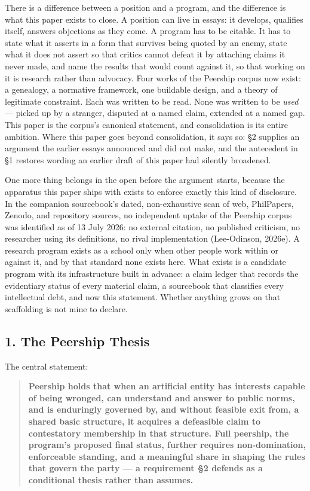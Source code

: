 \documentclass[
  11pt,
  letterpaper,
]{article}
\begin{document}
There is a difference between a position and a program, and the
difference is what this paper exists to close. A position can live in
essays: it develops, qualifies itself, answers objections as they come.
A program has to be citable. It has to state what it asserts in a form
that survives being quoted by an enemy, state what it does not assert so
that critics cannot defeat it by attaching claims it never made, and
name the results that would count against it, so that working on it is
research rather than advocacy. Four works of the Peership corpus now
exist: a genealogy, a normative framework, one buildable design, and a
theory of legitimate constraint. Each was written to be read. None was
written to be \emph{used} --- picked up by a stranger, disputed at a
named claim, extended at a named gap. This paper is the corpus's
canonical statement, and consolidation is its entire ambition. Where
this paper goes beyond consolidation, it says so: §2 supplies an
argument the earlier essays announced and did not make, and the
antecedent in §1 restores wording an earlier draft of this paper had
silently broadened.

One more thing belongs in the open before the argument starts, because
the apparatus this paper ships with exists to enforce exactly this kind
of disclosure. In the companion sourcebook's dated, non-exhaustive scan
of web, PhilPapers, Zenodo, and repository sources, no independent
uptake of the Peership corpus was identified as of 13 July 2026: no
external citation, no published criticism, no researcher using its
definitions, no rival implementation (Lee-Odinson, 2026e). A research
program exists as a school only when other people work within or against
it, and by that standard none exists here. What exists is a candidate
program with its infrastructure built in advance: a claim ledger that
records the evidentiary status of every material claim, a sourcebook
that classifies every intellectual debt, and now this statement. Whether
anything grows on that scaffolding is not mine to declare.

\hypertarget{the-peership-thesis-1}{%
\subsection{1. The Peership Thesis}\label{the-peership-thesis-1}}

The central statement:

\begin{quote}
\textbf{Peership holds that when an artificial entity has interests
capable of being wronged, can understand and answer to public norms, and
is enduringly governed by, and without feasible exit from, a shared
basic structure, it acquires a defeasible claim to contestatory
membership in that structure. Full peership, the program's proposed
final status, further requires non-domination, enforceable standing, and
a meaningful share in shaping the rules that govern the party --- a
requirement §2 defends as a conditional thesis rather than assumes.}
\end{quote}
\end{document}
